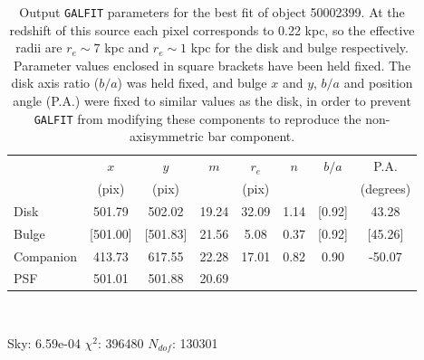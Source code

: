 \documentclass[11pt,twocolumn]{article}
\begin{document}
\begin{table}
\fontsize{9.2}{13}\selectfont
\centering
\begin{tabular*}{.8\textwidth}{@{\extracolsep{\fill}}lccccccc}
\toprule\toprule
 \multicolumn{1}{c}{} &
  \multicolumn{1}{c}{$x$} &
  \multicolumn{1}{c}{$y$} &
  \multicolumn{1}{c}{$m$} &
  \multicolumn{1}{c}{$r_{e}$} &
  \multicolumn{1}{c}{$n$} &
  \multicolumn{1}{c}{$b/a$} &
  \multicolumn{1}{c}{P.A.} \\
  \multicolumn{1}{c}{} &
  \multicolumn{1}{c}{(pix)} &
  \multicolumn{1}{c}{(pix)} &
  \multicolumn{1}{c}{} &
  \multicolumn{1}{c}{(pix)} &
  \multicolumn{1}{c}{} &
  \multicolumn{1}{c}{} &
  \multicolumn{1}{c}{(degrees)}\\
\midrule
  Disk & 501.79 & 502.02 & 19.24 & 32.09 & 1.14 & [0.92] & 43.28\\
  Bulge & [501.00] & [501.83] & 21.56 & 5.08 & 0.37 & [0.92] & [45.26]\\
  Companion & 413.73 & 617.55 & 22.28 & 17.01 & 0.82 & 0.90 & -50.07\\
  PSF & 501.01 & 501.88 & 20.69 &  & & & \\ 
\bottomrule\end{tabular*}\\
 \begin{flushleft}
\vspace{-0.7em}
\hspace{0.1\textwidth}Sky: 6.59e-04 \hspace{5em} $\chi^{2}$: 396480 \hspace{5em} $N_{dof}$: 130301 \\
\vspace{-1em}
\end{flushleft}
\caption{Output {\tt GALFIT} parameters for the best fit of object 50002399. At the redshift of this source each pixel corresponds to 0.22 kpc, so the effective radii are  $r_{e}\sim 7$ kpc and $r_{e} \sim 1$ kpc for the disk and bulge respectively. Parameter values enclosed in square brackets have been held fixed. The disk axis ratio ($b/a$) was held fixed, and bulge $x$ and $y$, $b/a$ and position angle (P.A.) were fixed to similar values as the disk, in order to prevent {\tt GALFIT} from modifying these components to reproduce the non-axisymmetric bar component.}\label{exampletable}
\end{table}

\end{document}
